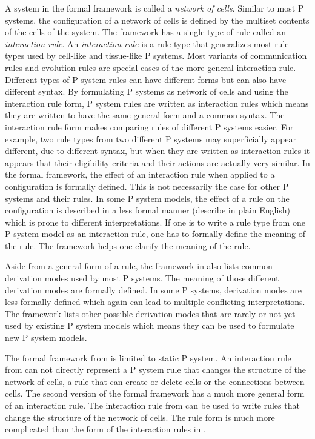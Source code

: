 \documentclass[a4paper]{article}
\theoremstyle{definition}
\begin{document}
A system in the formal framework is called a \emph{network of cells}. Similar to most P systems, the 
configuration of a network of cells is defined by the multiset contents of the cells of the system.
The framework has a single type of rule called an \emph{interaction rule}. An \emph{interaction 
rule} is a rule type that generalizes most rule types used by cell-like and tissue-like P systems. 
Most variants of communication rules and evolution rules are special cases of the more general 
interaction rule. Different types of P system rules can have different forms but can also have
different syntax. By formulating P systems as network of cells and using the interaction rule form,
P system rules are written as interaction rules which means they are written to have the same
general form and a common syntax. The interaction rule form makes comparing rules of different P 
systems easier. For example, two rule types from two different P systems may superficially appear 
different, due to different syntax,  but when they are written as interaction rules it appears that 
their eligibility criteria and their actions are actually very similar. In the formal framework, the 
effect of an interaction rule when applied to a configuration is formally defined. This is not 
necessarily the case for other P systems and their rules. In some P system models, the effect of a 
rule on the configuration is described in a less formal manner (describe in plain English) which is 
prone to different interpretations. If one is to write a rule type from one P system model as an
interaction rule, one has to formally define the meaning of the rule. The framework helps one 
clarify the meaning of the rule.

Aside from a general form of a rule, the framework in \cite{freund-2007-ff-1} also lists common
derivation modes used by most P systems. The meaning of those different derivation modes are 
formally defined. In some P systems, derivation modes are less formally defined which again can lead 
to multiple conflicting interpretations. The framework lists other possible derivation modes that
are rarely or not yet used by existing P system models which means they can be used to formulate new
P system models.
 
The formal framework from \cite{freund-2007-ff-1} is limited to static P system. An interaction rule
from \cite{freund-2007-ff-1} can not directly represent a P system rule that changes the structure
of the network of cells, a rule that can create or delete cells or the connections between cells. 
The second version of the formal framework \cite{freund-2013-ff-2} has a much more general form of 
an interaction rule. The interaction rule from \cite{freund-2013-ff-2} can be used to write rules 
that change the structure of the network of cells. The rule form is much more complicated than the 
form of the interaction rules in \cite{freund-2007-ff-1}.
\end{document}

